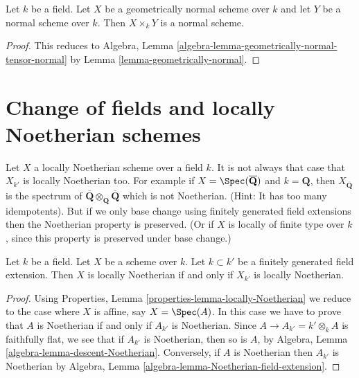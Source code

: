 \begin{lemma}
\label{lemma-fibre-product-normal}
Let $k$ be a field. Let $X$ be a geometrically normal scheme over $k$
and let $Y$ be a normal scheme over $k$. Then $X \times_k Y$ is a normal
scheme.
\end{lemma}

\begin{proof}
This reduces to
Algebra, Lemma \ref{algebra-lemma-geometrically-normal-tensor-normal}
by
Lemma \ref{lemma-geometrically-normal}.
\end{proof}










\section{Change of fields and locally Noetherian schemes}
\label{section-locally-Noetherian}

\noindent
Let $X$ a locally Noetherian scheme over a field $k$.
It is not always that case that $X_{k'}$ is locally Noetherian too.
For example if $X = \Spec(\overline{\mathbf{Q}})$ and
$k = \mathbf{Q}$, then $X_{\overline{\mathbf{Q}}}$ is the spectrum
of $\overline{\mathbf{Q}} \otimes_{\mathbf{Q}} \overline{\mathbf{Q}}$
which is not Noetherian. (Hint: It has too many idempotents).
But if we only base change using finitely generated field extensions
then the Noetherian property is preserved. (Or if $X$ is locally of finite
type over $k$, since this property is preserved under base change.)

\begin{lemma}
\label{lemma-locally-Noetherian-base-change}
Let $k$ be a field.
Let $X$ be a scheme over $k$.
Let $k \subset k'$ be a finitely generated field extension.
Then $X$ is locally Noetherian if and only if $X_{k'}$ is locally
Noetherian.
\end{lemma}

\begin{proof}
Using Properties, Lemma \ref{properties-lemma-locally-Noetherian}
we reduce to the case where $X$ is
affine, say $X = \Spec(A)$. In this case we have to prove that
$A$ is Noetherian if and only if $A_{k'}$ is Noetherian.
Since $A \to A_{k'} = k' \otimes_k A$ is faithfully flat, we see
that if $A_{k'}$ is Noetherian, then so is $A$, by
Algebra, Lemma \ref{algebra-lemma-descent-Noetherian}.
Conversely, if $A$ is Noetherian then $A_{k'}$ is Noetherian by
Algebra, Lemma \ref{algebra-lemma-Noetherian-field-extension}.
\end{proof}







